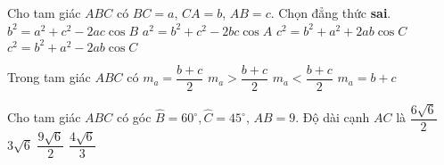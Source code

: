 \begin{ex}
	Cho tam giác $ABC$ có $BC=a$, $CA=b$, $AB=c$. Chọn đẳng thức \textbf{sai}.
	\choice
	{$b^2=a^2+c^2-2ac\cos B$}
	{$a^2=b^2+c^2-2bc\cos A$}
	{\True $c^2=b^2+a^2+2ab\cos C$}
	{$c^2=b^2+a^2-2ab\cos C$}
\end{ex}
\begin{ex}
	Trong tam giác $ABC$ có
	\choice
	{$m_a=\dfrac{b+c}{2}$}
	{$m_a>\dfrac{b+c}{2}$}
	{\True $m_a<\dfrac{b+c}{2}$}
	{$m_a=b+c$}
\end{ex}
\begin{ex}
	Cho tam giác $ABC$ có góc $\widehat{B}=60^{\circ}, \widehat{C}=45^{\circ}$, $AB=9$. Độ dài cạnh $AC$ là
	\choice
	{$\dfrac{6\sqrt{6}}{2}$}
	{$3\sqrt{6}$}
	{\True $\dfrac{9\sqrt{6}}{2}$}
	{$\dfrac{4\sqrt{6}}{3}$}
\end{ex}
